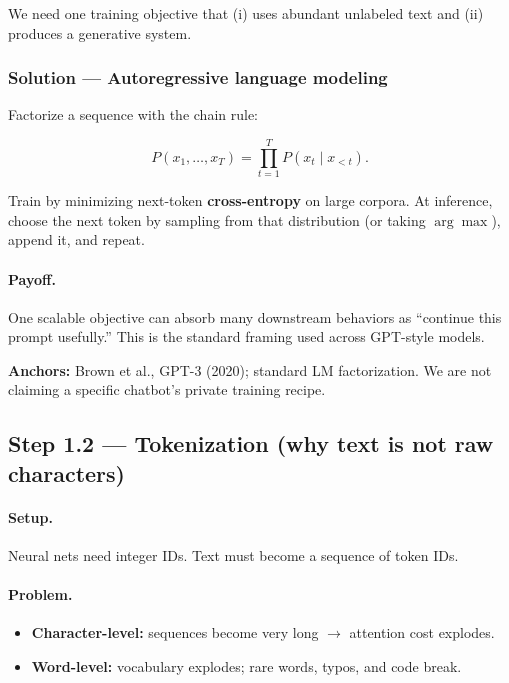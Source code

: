 \documentclass[11pt,a4paper]{article}
\begin{document}
We need one training objective that (i) uses abundant unlabeled text and (ii) produces a generative system.


\subsubsection{Solution --- Autoregressive language modeling}

Factorize a sequence with the chain rule:


\[
P(x_1,\ldots,x_T)=\prod_{t=1}^{T} P(x_t \mid x_{<t}).
\]


Train by minimizing next-token \textbf{cross-entropy} on large corpora. At inference, choose the next token by sampling from that distribution (or taking \(\arg\max\)), append it, and repeat.


\paragraph{Payoff.}

One scalable objective can absorb many downstream behaviors as ``continue this prompt usefully.'' This is the standard framing used across GPT-style models.


\textbf{Anchors:} Brown et al., GPT-3 (2020); standard LM factorization. We are not claiming a specific chatbot's private training recipe.


\subsection{Step 1.2 --- Tokenization (why text is not raw characters)}


\paragraph{Setup.}

Neural nets need integer IDs. Text must become a sequence of token IDs.


\paragraph{Problem.}

\begin{itemize}
\item \textbf{Character-level:} sequences become very long $\rightarrow$ attention cost explodes.  
\item \textbf{Word-level:} vocabulary explodes; rare words, typos, and code break.
\end{itemize}
\end{document}
